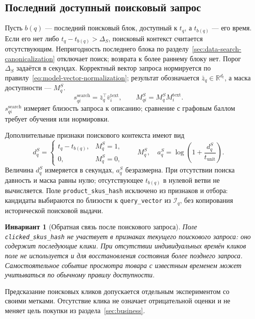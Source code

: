 \documentclass[12pt,a4paper]{article}
\newcommand{\code}[1]{{\ttfamily\small\nolinkurl{#1}}}
\newcommand{\R}{\mathbb R}
\theoremstyle{plainru}
\newtheorem{invariant}{Инвариант}[section]
\begin{document}
\subsection{Последний доступный поисковый запрос}

Пусть $b(q)$ --- последний поисковый блок, доступный к $t_q$,
а $t_{b(q)}$ --- его время. Если его нет либо
$t_q-t_{b(q)}>\Delta_S$, поисковый контекст считается отсутствующим.
Непригодность последнего блока по
разделу~\ref{sec:data-search-canonicalization} отключает поиск;
возврата к более раннему блоку нет.
Порог $\Delta_S$ задаётся в секундах. Корректный вектор запроса
нормируется по правилу~\eqref{eq:model-vector-normalization};
результат обозначается $\bar z_q\in\R^{d_t}$,
а маска доступности --- $M_q^S$.
\begin{equation}\label{eq:model-search-score}
s_{qi}^{\mathrm{search}}=\bar z_q^\top\bar v_i^{\mathrm{text}},\qquad
M_{qi}^S=M_q^S M_i^{\mathrm{text}}.
\end{equation}
$s_{qi}^{\mathrm{search}}$ измеряет близость запроса к описанию;
сравнение с графовым баллом требует обучения или нормировки.

Дополнительные признаки поискового контекста имеют вид
\begin{equation}\label{eq:model-search-features}
d_q^S=\begin{cases}
t_q-t_{b(q)},&M_q^S=1,\\
0,&M_q^S=0,
\end{cases}
\qquad M_q^S,\quad
a_q^S=\log\!\left(1+\frac{d_q^S}{t_{\mathrm{unit}}}\right).
\end{equation}
Величина $d_q^S$ измеряется в секундах, $a_q^S$ безразмерна.
При отсутствии поиска давность и маска равны нулю; отсутствующее
$t_{b(q)}$ в нулевой ветви не вычисляется.
Поле \code{product_skus_hash} исключено из признаков и отбора:
кандидаты выбираются по близости к \code{query_vector} из $\mathcal I_q$,
без копирования исторической поисковой выдачи.

\begin{invariant}[Обратная связь после поискового запроса]
Поле \code{clicked_skus_hash} не участвует в признаках текущего
поискового запроса: оно содержит последующие клики.
При отсутствии индивидуальных времён кликов поле не используется
и для восстановления состояния более позднего запроса.
Самостоятельное событие просмотра товара с известным временем
может учитываться по обычному правилу доступности.
\end{invariant}

Предсказание поисковых кликов допускается отдельным экспериментом
со своими метками. Отсутствие клика не означает отрицательной оценки
и не меняет цель покупки из раздела~\ref{sec:business}.
\end{document}
